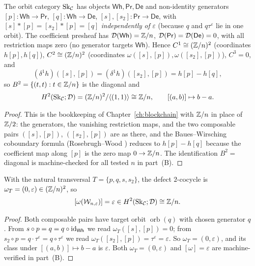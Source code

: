 \begin{proposition}
\label{prop:supply-h2}
The orbit category $\mathrm{Sk}_{\mathcal{C}}$ has objects $\mathsf{Wh},\mathsf{Pr},
\mathsf{De}$ and non-identity generators $[p]:\mathsf{Wh}\to\mathsf{Pr}$,
$[q]:\mathsf{Wh}\to\mathsf{De}$, $[s],[s_2]:\mathsf{Pr}\to\mathsf{De}$, with
$[s]\ast[p]=[s_2]\ast[p]=[q]$ \emph{independently of $\varepsilon$} (because $q$
and $q\tau^\varepsilon$ lie in one orbit). The coefficient presheaf has
$\mathcal{D}(\mathsf{Wh})=\mathbb{Z}/n$, $\mathcal{D}(\mathsf{Pr})=\mathcal{D}(\mathsf{De})=0$, with all restriction
maps zero (no generator targets $\mathsf{Wh}$). Hence $C^1\cong(\mathbb{Z}/n)^2$
(coordinates $h[p],h[q]$), $C^2\cong(\mathbb{Z}/n)^2$ (coordinates $\omega([s],[p]),
\omega([s_2],[p])$), $C^3=0$, and
\[
   (\delta^1 h)([s],[p])=(\delta^1 h)([s_2],[p])=h[p]-h[q],
\]
so $B^2=\{(t,t):t\in\mathbb{Z}/n\}$ is the diagonal and
\[
   H^2(\mathrm{Sk}_{\mathcal{C}};\mathcal{D})=(\mathbb{Z}/n)^2/\langle(1,1)\rangle\cong\mathbb{Z}/n,
   \qquad [(a,b)]\mapsto b-a.
\]
\end{proposition}

\begin{proof}
This is the bookkeeping of Chapter~\ref{ch:blockchain} with $\mathbb{Z}/n$ in place of
$\mathbb{Z}/2$: the generators, the vanishing restriction maps, and the two composable
pairs $([s],[p])$, $([s_2],[p])$ are as there, and the Baues--Wirsching
coboundary formula (Rosebrugh--Wood \cite{rw}) reduces to $h[p]-h[q]$ because the
coefficient map along $[p]$ is the zero map $0\to\mathbb{Z}/n$. The identification
$B^2=$ diagonal is machine-checked for all tested $n$ in part~(B).
\end{proof}

\begin{theorem}
\label{thm:supply-class}
With the natural transversal $T=\{p,q,s,s_2\}$, the defect $2$-cocycle is
$\omega_T=(0,\varepsilon)\in(\mathbb{Z}/n)^2$, so
\[
   [\omega(\mathcal W_{n,\varepsilon})]=\varepsilon
   \in H^2(\mathrm{Sk}_{\mathcal{C}};\mathcal{D})\cong\mathbb{Z}/n .
\]
\end{theorem}

\begin{proof}
Both composable pairs have target orbit $\operatorname{orb}(q)$ with chosen
generator $q$. From $s\circ p=q=q\circ\mathrm{id}_{\mathsf{Wh}}$ we read
$\omega_T([s],[p])=0$; from $s_2\circ p=q\cdot\tau^\varepsilon=q\circ\tau^\varepsilon$
we read $\omega_T([s_2],[p])=\tau^\varepsilon=\varepsilon$. So
$\omega_T=(0,\varepsilon)$, and its class under $[(a,b)]\mapsto b-a$ is
$\varepsilon$. Both $\omega_T=(0,\varepsilon)$ and $[\omega]=\varepsilon$ are
machine-verified in part~(B).
\end{proof}

